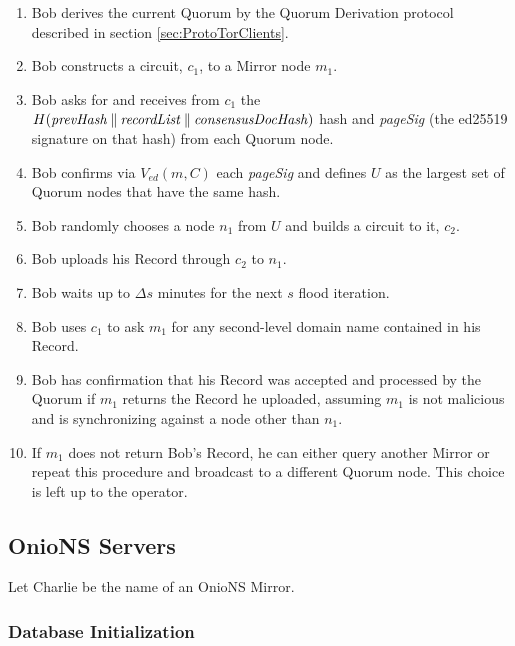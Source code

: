 \begin{enumerate}
	\item Bob derives the current Quorum by the Quorum Derivation protocol described in section \ref{sec:ProtoTorClients}.
	\item Bob constructs a circuit, $ c_{1} $, to a Mirror node $ m_{1} $.
	\item Bob asks for and receives from $ c_{1} $ the $ H(\mathit{prevHash} \mathbin{\|} \mathit{recordList} \mathbin{\|} \mathit{consensusDocHash}) $ hash and \emph{pageSig} (the ed25519 signature on that hash) from each Quorum node.
	\item Bob confirms via $ V_{\mathit{ed}}(m, C) $ each \emph{pageSig} and defines $ U $ as the largest set of Quorum nodes that have the same hash. %
	\item Bob randomly chooses a node $ n_{1} $ from $ U $ and builds a circuit to it, $ c_{2} $.
	\item Bob uploads his Record through $ c_{2} $ to $ n_{1} $.
	\item Bob waits up to $ \Delta s $ minutes for the next $ s $ flood iteration.
	\item Bob uses $ c_{1} $ to ask $ m_{1} $ for any second-level domain name contained in his Record.
	\item Bob has confirmation that his Record was accepted and processed by the Quorum if $ m_{1} $ returns the Record he uploaded, assuming $ m_{1} $ is not malicious and is synchronizing against a node other than $ n_{1} $.
	\item If $ m_{1} $ does not return Bob's Record, he can either query another Mirror or repeat this procedure and broadcast to a different Quorum node. This choice is left up to the operator.
\end{enumerate}


\subsection{OnioNS Servers}
\label{sec:ProtoOnioNServers}

Let Charlie be the name of an OnioNS Mirror.

\subsubsection{Database Initialization}

